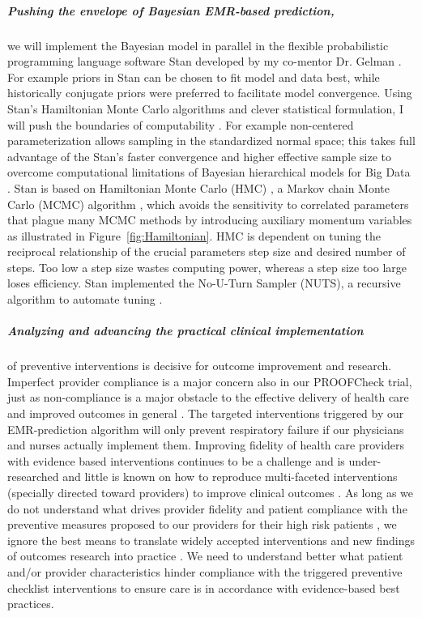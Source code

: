 \documentclass[11pt,notitlepage]{article}
\begin{document}
\subparagraph{Pushing the envelope of Bayesian EMR-based prediction,}
we will implement the Bayesian model in parallel in the flexible probabilistic programming language software Stan developed by my co-mentor Dr. Gelman \cite{Stan_Software_2014}. For example priors in Stan can be chosen to fit model and data best, while historically conjugate priors were preferred to facilitate model convergence.  Using Stan's Hamiltonian Monte Carlo algorithms \cite{Stan_Software_2014} and clever statistical formulation, I will push the boundaries of computability \cite{Gelman-Hill_2014}. For example non-centered parameterization allows sampling in the standardized normal space; this takes full advantage of the Stan's faster convergence and higher effective sample size to overcome computational limitations of Bayesian hierarchical models for Big Data \cite{Gelman-Hill_2014}. Stan  is based on Hamiltonian Monte Carlo (HMC) \cite{Gelman-Hill_2014}, a Markov chain Monte Carlo (MCMC) algorithm \cite{StanislawUlam_1949}, which avoids the sensitivity to correlated parameters that plague many MCMC methods by introducing auxiliary momentum variables \cite{Homan_Gelman_NUTS_2014} as illustrated in Figure~\ref{fig:Hamiltonian}. HMC is dependent on tuning the reciprocal relationship of the crucial parameters step size and desired number of steps. Too low a step size wastes computing power, whereas a step size too large loses efficiency. Stan implemented the No-U-Turn Sampler (NUTS), a recursive algorithm to automate tuning \cite{Homan_Gelman_NUTS_2014}.   

\subparagraph*{Analyzing and advancing the practical clinical implementation} of preventive interventions is decisive for outcome improvement and research. Imperfect provider compliance is a major concern also in our PROOFCheck trial, just as non-compliance is a major obstacle to the effective delivery of health care and improved outcomes in general
\cite{Duncan_16710766}. The targeted interventions triggered by our EMR-prediction algorithm will only prevent respiratory failure if our physicians and nurses actually implement them. Improving fidelity of health care providers with evidence based interventions continues to be a challenge and is under-researched \cite{Davis_7650822} and little is known on how to reproduce multi-faceted interventions (specially directed toward providers) to improve clinical outcomes \cite{Campbell_10987780}. As long as we do not understand what drives provider fidelity and patient compliance with the preventive measures proposed to our providers for their high risk patients  \cite{Mittman_15172904}, we ignore the best means to translate widely accepted interventions and new findings of outcomes research into practice \cite{Glasgow_17150029}. We need to understand better what patient and/or provider characteristics hinder compliance with the triggered preventive checklist interventions to ensure care is in accordance with evidence-based best practices.
\end{document}
